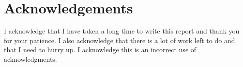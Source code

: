 \section*{Acknowledgements}
I acknowledge that I have taken a long time to write this report and thank you for your patience. I also acknowledge that there is a lot of work left to do and that I need to hurry up. I acknowledge this is an incorrect use of acknowledgments.
